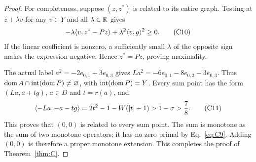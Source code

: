 \begin{proof}
For completeness, suppose $(z,z^*)$ is related to its entire graph.
Testing at $z+\lambda v$ for any $v\in Y$ and all $\lambda\in\mathbb R$ gives
\begin{equation}
-\lambda\langle v,z^*-Pz\rangle+\lambda^2\langle v,g\rangle^2\ge0.
\tag{C10}\label{eq:C10}
\end{equation}
If the linear coefficient is nonzero, a sufficiently small $\lambda$ of
the opposite sign makes the expression negative. Hence $z^*=Pz$, proving maximality.

The actual label $a^2=-2e_{0,1}+3e_{0,3}$ gives
$La^2=-6e_{0,1}-8e_{0,2}-3e_{0,3}$. Thus
$\operatorname{dom} A\cap\operatorname{int}(\operatorname{dom} P)\ne\varnothing$, with
$\operatorname{int}(\operatorname{dom} P)=Y$. Every sum point has the form
$(La,a+tg)$, $a\in D$ and $t=r(a)$, and
\begin{equation}
\langle -La,-a-tg\rangle=2t^2-1-W(|t|-1)>1-\sigma>\frac{7}{8}.
\tag{C11}\label{eq:C11}
\end{equation}
This proves that $(0,0)$ is related to every sum point. The sum is
monotone as the sum of two monotone operators; it has no zero primal by
Eq.~\eqref{eq:C9}. Adding $(0,0)$ is therefore a proper monotone extension.
This completes the proof of Theorem~\ref{thm:C}.
\end{proof}


